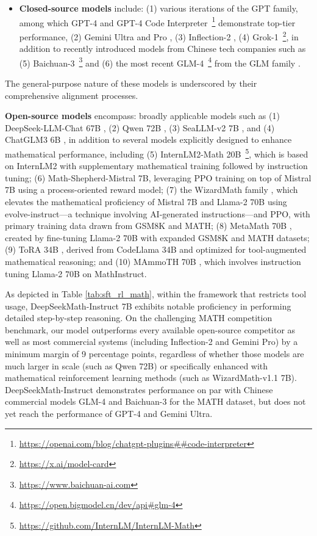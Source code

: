 \begin{itemize}[topsep=0pt]
    \item \textbf{Closed-source models} include: (1) various iterations of the GPT family, among which GPT-4 \citep{gpt4} and GPT-4 Code Interpreter~\footnote{\url{https://openai.com/blog/chatgpt-plugins\#\#code-interpreter}} demonstrate top-tier performance, (2) Gemini Ultra and Pro \citep{gemini}, (3) Inflection-2 \citep{inflection-2}, (4) Grok-1~\footnote{\url{https://x.ai/model-card}}, in addition to recently introduced models from Chinese tech companies such as (5) Baichuan-3~\footnote{\url{https://www.baichuan-ai.com}} and (6) the most recent GLM-4~\footnote{\url{https://open.bigmodel.cn/dev/api\#glm-4}}
    from the GLM family \citep{glm}.
\end{itemize}

The general-purpose nature of these models is underscored by their comprehensive alignment processes.
\item \textbf{Open-source models} encompass: broadly applicable models such as (1) DeepSeek-LLM-Chat 67B \citep{deepseek-llm}, (2) Qwen 72B \citep{qwen}, (3) SeaLLM-v2 7B \citep{seallm}, and (4) ChatGLM3 6B \citep{chatglm3}, in addition to several models explicitly designed to enhance mathematical performance, including (5) InternLM2-Math 20B~\footnote{\url{https://github.com/InternLM/InternLM-Math}}, which is based on InternLM2 with supplementary mathematical training followed by instruction tuning; (6) Math-Shepherd-Mistral 7B, leveraging PPO training \citep{schulman2017proximal} on top of Mistral 7B \citep{mistral} using a process-oriented reward model; (7) the WizardMath family \citep{wizardmath}, which elevates the mathematical proficiency of Mistral 7B and Llama-2 70B \citep{llama2} using evolve-instruct—a technique involving AI-generated instructions—and PPO, with primary training data drawn from GSM8K and MATH; (8) MetaMath 70B \citep{metamath}, created by fine-tuning Llama-2 70B with expanded GSM8K and MATH datasets; (9) ToRA 34B \cite{tora}, derived from CodeLlama 34B and optimized for tool-augmented mathematical reasoning; and (10) MAmmoTH 70B \citep{MathInstruct}, which involves instruction tuning Llama-2 70B on MathInstruct.

As depicted in Table \ref{tab:sft_rl_math}, within the framework that restricts tool usage, DeepSeekMath-Instruct 7B exhibits notable proficiency in performing detailed step-by-step reasoning. On the challenging MATH competition benchmark, our model outperforms every available open-source competitor as well as most commercial systems (including Inflection-2 and Gemini Pro) by a minimum margin of 9 percentage points, regardless of whether those models are much larger in scale (such as Qwen 72B) or specifically enhanced with mathematical reinforcement learning methods (such as WizardMath-v1.1 7B). DeepSeekMath-Instruct demonstrates performance on par with Chinese commercial models GLM-4 and Baichuan-3 for the MATH dataset, but does not yet reach the performance of GPT-4 and Gemini Ultra.

